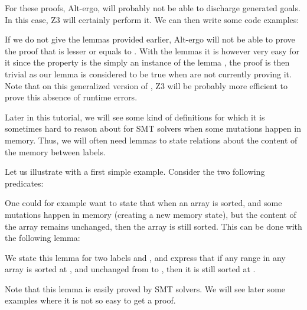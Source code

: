 


For these proofs, Alt-ergo, will probably not be able to discharge
generated goals. In this case, Z3 will certainly perform it. We can then
write some code examples:






If we do not give the lemmas provided earlier, Alt-ergo will not be able
to prove the proof that  is lesser or equals to
. With the lemmas it is however very easy for it since the
property is the simply an instance of the lemma
, the proof is then trivial as our lemma is
considered to be true when are not currently proving it. Note that on this
generalized version of , Z3 will be probably more efficient
to prove this absence of runtime errors.




Later in this tutorial, we will see some kind of definitions for which it is
sometimes hard to reason about for SMT solvers when some mutations happen in
memory. Thus, we will often need lemmas to state relations about the content
of the memory between labels.


Let us illustrate with a first simple example. Consider the two following
predicates:




One could for example want to state that when an array is sorted, and some
mutations happen in memory (creating a new memory state), but the content of the
array remains unchanged, then the array is still sorted. This can be done with
the following lemma:




We state this lemma for two labels  and , and
express that if any range in any array is sorted at , and
unchanged from  to , then it is still sorted at
.


Note that this lemma is easily proved by SMT solvers. We will see later some
examples where it is not so easy to get a proof.






